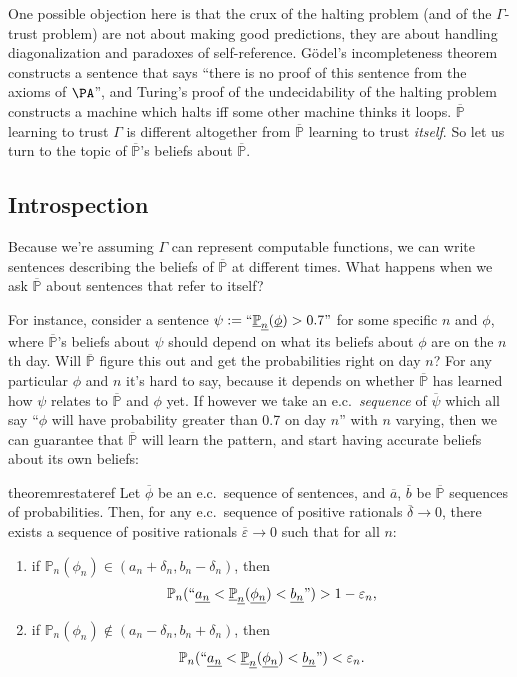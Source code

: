\documentclass[authordate,onecolumn,noenvironments]{miri-tech-article}
\numberwithin{equation}{subsection}
\newcommand{\quot}[1]{``#1"}
\newcommand{\enc}[1]{{\underline{#1}}}
\newcommand{\seq}[1]{{\overline{#1}}}
\newcommand{\nn}{n}
\newcommand{\phis}{\seq{\phi}}
\newcommand{\psis}{\seq{\psi}}
\newcommand{\deltas}{\seq{\delta}}
\newcommand{\varepsilons}{\seq{{\varepsilon}}}
\newcommand{\ec}[1][\ ]{e.c.#1}
\newcommand{\pgenable}{\ensuremath{\MP}\text{-generable}\xspace}
\newcommand{\representscomputations}{can represent computable functions}
\newcommand{\rparenthetical}[1]{\hfill\upshape{{\small (#1)}}} %
\newcommand{\proofin}[1]{\rparenthetical{Proof in:~#1.}}
\newcommand{\BelState}{\mathbb{P}}
\newcommand{\pt}{\BelState}
\newcommand{\MP}{\seq{\pt}}
\newcommand{\Theory}{\Gamma}
\begin{document}
One possible objection here is that the crux of the halting problem (and of the $\Theory$-trust problem) are not about making good predictions, they are about handling diagonalization and paradoxes of self-reference. G\"odel's incompleteness theorem constructs a sentence that says ``there is no proof of this sentence from the axioms of $\PA$'', and Turing's proof of the undecidability of the halting problem constructs a machine which halts iff some other machine thinks it loops. $\MP$ learning to trust $\Theory$ is different altogether from $\MP$ learning to trust \emph{itself}. So let us turn to the topic of $\MP$'s beliefs about $\MP$.


\subsection{Introspection}\label{sec:introspection}

Because we're assuming $\Theory$ \representscomputations, we can write sentences describing the beliefs of $\MP$ at different times. What happens when we ask $\MP$ about sentences that refer to itself?

For instance, consider a sentence $\psi := \quot{\enc{\pt}_{\enc{\nn}}(\enc{\smash{\phi}}) > 0.7}$ for some specific $\nn$ and $\phi$, where $\MP$'s beliefs about $\psi$ should depend on what its beliefs about $\phi$ are on the $\nn$th day. Will $\MP$ figure this out and get the probabilities right on day $\nn$? For any particular $\phi$ and $\nn$ it's hard to say, because it depends on whether $\MP$ has learned how $\psi$ relates to $\MP$ and $\phi$ yet. If however we take an \ec \emph{sequence} of $\psis$ which all say ``$\phi$ will have probability greater than 0.7 on day $\nn$'' with $\nn$ varying, then we can guarantee that $\MP$ will learn the pattern, and start having accurate beliefs about its own beliefs:

\begin{restatable}[Introspection]{theorem}{restateref}\label{thm:ref}
  Let $\phis$ be an \ec sequence of sentences, and $\seq{a}$, $\seq{b}$ be \pgenable sequences of probabilities. Then, for any \ec sequence of positive rationals $\deltas \to 0$, there exists a sequence of positive rationals $\varepsilons \to 0$ such that for all $\nn$:
  \begin{enumerate}    
    \item if $\pt_\nn(\phi_\nn)\in(a_\nn+\delta_\nn,b_\nn-\delta_\nn)$, then
    \[
      \pt_\nn(\quot{\enc{a_\nn} < \enc{\pt}_\enc{\nn}(\enc{\phi_\nn}) < \enc{b_\nn}}) > 1-\varepsilon_\nn,
    \] 
    \item if $\pt_\nn(\phi_\nn)\notin(a_\nn-\delta_\nn,b_\nn+\delta_\nn)$, then
    \[
      \pt_\nn(\quot{\enc{a_\nn} < \enc{\pt}_\enc{\nn}(\enc{\phi_\nn}) < \enc{b_\nn}}) < \varepsilon_\nn.
    \] 
  \end{enumerate}
  \proofin{\ref{app:ref}}
\end{restatable}
\end{document}
